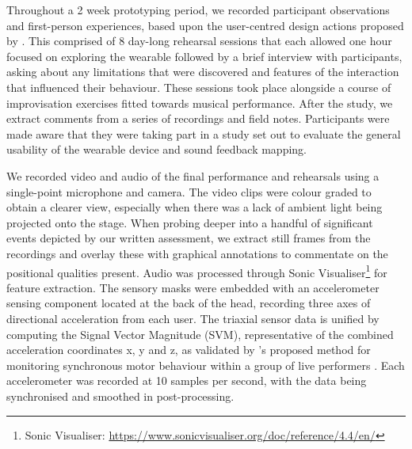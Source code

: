 Throughout a 2 week prototyping period, we recorded participant observations and first-person experiences, based upon the user-centred design actions proposed by \citeauthor{bernardo_user-centred_2018} \cite{bernardo_user-centred_2018}. This comprised of 8 day-long rehearsal sessions that each allowed one hour focused on exploring the wearable followed by a brief interview with participants, asking about any limitations that were discovered and features of the interaction that influenced their behaviour. These sessions took place alongside a course of improvisation exercises fitted towards musical performance. After the study, we extract comments from a series of recordings and field notes. Participants were made aware that they were taking part in a study set out to evaluate the general usability of the wearable device and sound feedback mapping.

We recorded video and audio of the final performance and rehearsals using a single-point microphone and camera. The video clips were colour graded to obtain a clearer view, especially when there was a lack of ambient light being projected onto the stage. When probing deeper into a handful of significant events depicted by our written assessment, we extract still frames from the recordings and overlay these with graphical annotations to commentate on the positional qualities present. Audio was processed through Sonic Visualiser\footnote{Sonic Visualiser: \url{https://www.sonicvisualiser.org/doc/reference/4.4/en/}} for feature extraction. The sensory masks were embedded with an accelerometer sensing component located at the back of the head, recording three axes of directional acceleration from each user. The triaxial sensor data is unified by computing the Signal Vector Magnitude (SVM), representative of the combined acceleration coordinates x, y and z, as validated by \citeauthor{ward_sensing_2018}'s proposed method for monitoring synchronous motor behaviour within a group of live performers \cite{ward_sensing_2018}. Each accelerometer was recorded at 10 samples per second, with the data being synchronised and smoothed in post-processing.

